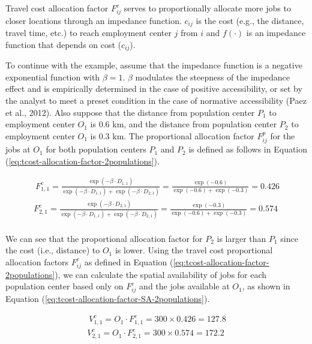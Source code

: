 \documentclass[]{elsarticle} %
\begin{document}
Travel cost allocation factor \(F^c_{ij}\) serves to proportionally
allocate more jobs to closer locations through an impedance function.
\(c_{ij}\) is the cost (e.g., the distance, travel time, etc.) to reach
employment center \(j\) from \(i\) and \(f(\cdot)\) is an impedance
function that depends on cost (\(c_{ij}\)).

To continue with the example, assume that the impedance function is a
negative exponential function with \(\beta=1\). \(\beta\) modulates the
steepness of the impedance effect and is empirically determined in the
case of positive accessibility, or set by the analyst to meet a preset
condition in the case of normative accessibility (Paez et al., 2012).
Also suppose that the distance from population center \(P_1\) to
employment center \(O_1\) is 0.6 km, and the distance from population
center \(P_2\) to employment center \(O_1\) is 0.3 km. The proportional
allocation factor \(F^p_{ij}\) for the jobs at \(O_1\) for both
population centers \(P_1\) and \(P_2\) is defined as follows in Equation
(\ref{eq:tcost-allocation-factor-2populations}).

\begin{equation}
\label{eq:tcost-allocation-factor-2populations}
\begin{array}{l}\
F^c_{1,1} = \frac{\exp(-\beta \cdot D_{1,1})}{\exp(-\beta \cdot D_{1,1}) + \exp(-\beta \cdot D_{2,1})} = \frac{\exp(-0.6)}{\exp(-0.6) + \exp(-0.3)} = 0.426\\
F^c_{2,1} = \frac{\exp(-\beta \cdot D_{2,1})}{\exp(-\beta \cdot D_{1,1}) + \exp(-\beta \cdot D_{2,1})}  = \frac{\exp(-0.3)}{\exp(-0.6) + \exp(-0.3)} = 0.574\\
\end{array}
\end{equation}

We can see that the proportional allocation factor for \(P_2\) is larger
than \(P_1\) since the cost (i.e., distance) to \(O_1\) is lower. Using
the travel cost proportional allocation factors \(F^c_{ij}\) as defined
in Equation (\ref{eq:tcost-allocation-factor-2populations}), we can
calculate the spatial availability of jobs for each population center
based only on \(F^c_{ij}\) and the jobs available at \(O_1\), as shown
in Equation (\ref{eq:tcost-allocation-factor-SA-2populations}).

\begin{equation}
\label{eq:tcost-allocation-factor-SA-2populations}
\begin{array}{l}\
V^c_{1,1} = O_1 \cdot F^c_{1,1} = 300 \times 0.426 = 127.8\\
V^c_{2,1} = O_1 \cdot F^c_{2,1} = 300 \times  0.574 = 172.2\\
\end{array}
\end{equation}
\end{document}
